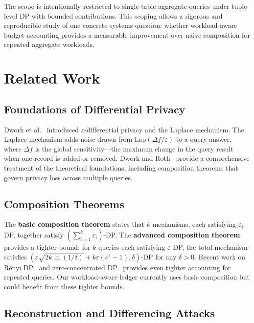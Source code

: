 \documentclass[sigconf,nonacm]{acmart}
\begin{document}
The scope is intentionally restricted to single-table aggregate queries under tuple-level DP with bounded contributions. This scoping allows a rigorous and reproducible study of one concrete systems question: whether workload-aware budget accounting provides a measurable improvement over naive composition for repeated aggregate workloads.

\section{Related Work}
\label{sec:related}

\subsection{Foundations of Differential Privacy}

Dwork et al.~\cite{dwork2006calibrating} introduced $\varepsilon$-differential privacy and the Laplace mechanism. The Laplace mechanism adds noise drawn from $\text{Lap}(\Delta f / \varepsilon)$ to a query answer, where $\Delta f$ is the global sensitivity---the maximum change in the query result when one record is added or removed. Dwork and Roth~\cite{dwork2014algorithmic} provide a comprehensive treatment of the theoretical foundations, including composition theorems that govern privacy loss across multiple queries.

\subsection{Composition Theorems}

The \textbf{basic composition theorem} states that $k$ mechanisms, each satisfying $\varepsilon_i$-DP, together satisfy $(\sum_{i=1}^{k} \varepsilon_i)$-DP. The \textbf{advanced composition theorem}~\cite{dwork2010boosting} provides a tighter bound: for $k$ queries each satisfying $\varepsilon$-DP, the total mechanism satisfies $(\varepsilon\sqrt{2k \ln(1/\delta)} + k\varepsilon(e^{\varepsilon}-1), \delta)$-DP for any $\delta > 0$. Recent work on R\'enyi DP~\cite{mironov2017renyi} and zero-concentrated DP~\cite{bun2016concentrated} provides even tighter accounting for repeated queries. Our workload-aware ledger currently uses basic composition but could benefit from these tighter bounds.

\subsection{Reconstruction and Differencing Attacks}
\end{document}
